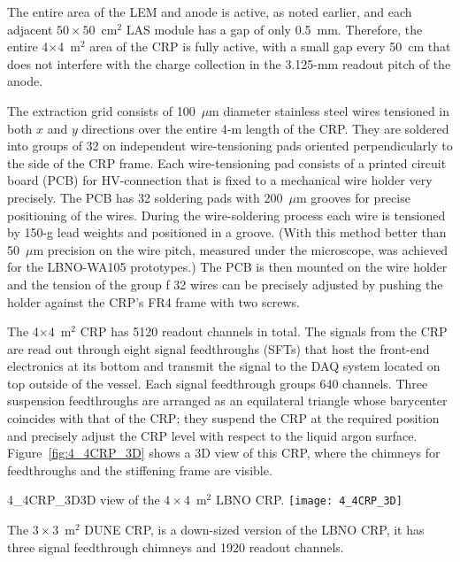 The entire area of the LEM and anode is active, as noted earlier, and each adjacent $50\times50$~cm$^2$ LAS module has a gap of only 0.5~mm.
Therefore, the entire 4$\times$4~m$^2$ area of the CRP is fully active, with a small gap every 50~cm that does not interfere with the charge collection in the 3.125-mm readout pitch of the anode.

The extraction grid consists of 100~$\mu$m diameter stainless steel wires tensioned in both $x$ and $y$ directions over the entire 4-m
length of the CRP. They are soldered into groups of 32 on independent wire-tensioning pads  oriented perpendicularly to the side of the CRP
frame.  Each wire-tensioning pad consists of a printed circuit board (PCB) for HV-connection that is fixed to a mechanical wire holder very precisely. The PCB
has 32 soldering pads with 200~$\mu$m grooves for precise positioning of the wires. During the wire-soldering process each wire is tensioned by
150-g lead weights and positioned in a groove.  (With this method  better than 50~$\mu$m precision on the wire pitch, measured under the microscope, was achieved for the LBNO-WA105 prototypes.) The PCB is then mounted on the wire holder and the tension of the group f 32 wires can be precisely adjusted by pushing  the holder against the CRP's FR4 frame  with two screws.


The 4$\times$4~m$^2$ CRP has 5120 readout channels in total. The signals from the CRP are read out through eight signal feedthroughs (SFTs) that host the front-end electronics at its bottom and transmit the signal to the DAQ system located on top outside of the vessel.  Each signal feedthrough groups
640 channels. Three suspension feedthroughs are arranged as an equilateral triangle whose barycenter coincides with that of the CRP; they suspend the CRP at the required position and precisely adjust the CRP level with respect to the liquid argon surface. Figure~\ref{fig:4_4CRP_3D} shows
a 3D view of this CRP, where the chimneys for feedthroughs and the stiffening frame are visible.

\begin{cdrfigure}{4_4CRP_3D}{3D view of the $4\times4$~m$^2$ LBNO CRP.}
\texttt{[image: 4\_4CRP\_3D]}  
\end{cdrfigure}

The $3\times3$~m$^2$ DUNE CRP, is a down-sized version of the LBNO CRP, it  has three signal feedthrough chimneys and 1920 readout channels.


